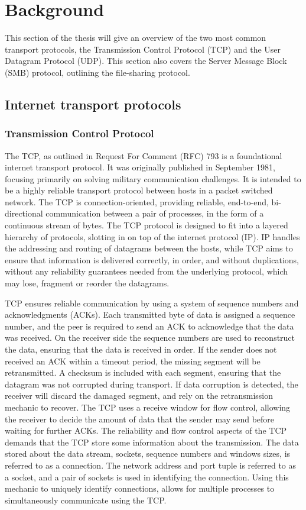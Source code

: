 \documentclass[english, 12pt, a4paper, elec, utf8, a-2b, online]{aaltothesis}
\begin{document}
\section{Background}
\label{sec:background}
This section of the thesis will give an overview of the two most common transport
protocols, the Transmission Control Protocol (TCP) and the User Datagram Protocol (UDP).
This section also covers the Server Message Block (SMB) protocol, outlining the
file-sharing protocol.
\subsection{Internet transport protocols}
\subsubsection{Transmission Control Protocol}
The TCP, as outlined in Request For Comment (RFC)
793 is a foundational internet transport protocol. It was
originally published in September 1981, focusing primarily on solving military
communication challenges. It is intended to be a highly reliable transport
protocol between hosts in a packet switched network. The TCP is connection-oriented,
providing reliable, end-to-end, bi-directional communication between a pair of processes, in the
form of a continuous stream of bytes. The TCP protocol is designed to fit into
a layered hierarchy of protocols, slotting
in on top of the internet protocol (IP)\cite{rfc791}. IP handles the addressing
and routing of datagrams between the hosts, while TCP aims to ensure that
information is delivered correctly, in order, and without duplications, without
any reliability guarantees needed from the underlying protocol, which may lose,
fragment or reorder the datagrams\cite{rfc793}.

TCP ensures reliable communication by using a system of sequence numbers and
acknowledgments (ACKs). Each transmitted byte of data is assigned a sequence
number, and the peer is required to send an ACK to acknowledge that the data was
received. On the receiver side the sequence numbers are used to reconstruct the
data, ensuring that the data is received in order. If the sender does not received
an ACK within a timeout period, the missing segment will be retransmitted. A
checksum is included with each segment, ensuring that the datagram was not
corrupted during transport. If data corruption is detected, the receiver will
discard the damaged segment, and rely on the retransmission mechanic to recover.
The TCP uses a receive window for flow control, allowing the receiver to decide 
the amount of data that the sender may send before waiting for further ACKs. The
reliability and flow control aspects of the TCP demands that the TCP store some
information about the transmission. The data stored about the data stream, sockets,
sequence numbers and windows sizes, is referred to as a connection. The network
address and port tuple is referred to as a socket, and a pair of sockets is used
in identifying the connection. Using this mechanic to uniquely identify connections,
allows for multiple processes to simultaneously communicate using the TCP\cite{rfc793}.
\end{document}
